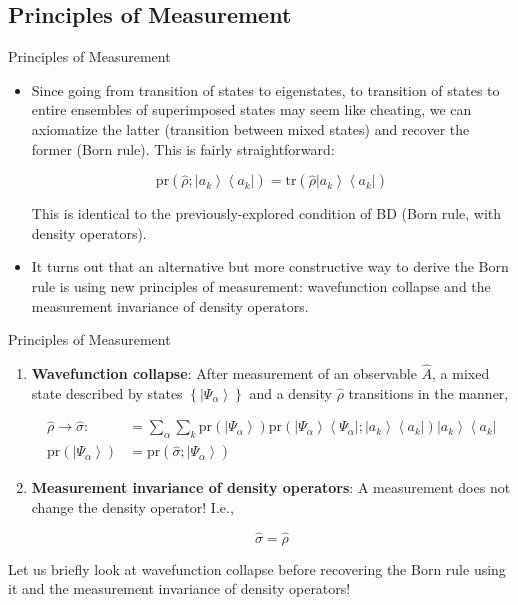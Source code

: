 \documentclass[9pt,handout]{beamer}
\newcommand{\pr}[0]{\text{pr}}
\newcommand{\tr}[0]{\text{tr}}
\begin{document}
\subsection{Principles of Measurement}
\begin{frame}{Principles of Measurement}
\begin{itemize}
\item Since going from transition of states to eigenstates, to transition of states to entire ensembles of superimposed states may seem like cheating, we can axiomatize the latter (transition between mixed states) and recover the former (Born rule). This is fairly straightforward:

$$\pr \left( \widehat{\rho}; \left\lvert a_k \right\rangle \left\langle a_k \right\rvert \right) = \tr \left( \widehat{\rho} \left\lvert a_k \right\rangle \left\langle a_k \right\rvert \right)$$

This is identical to the previously-explored condition of BD (Born rule, with density operators).

\item It turns out that an alternative but more constructive way to derive the Born rule is using new principles of measurement: wavefunction collapse and the measurement invariance of density operators.
\end{itemize}
\end{frame}

\begin{frame}{}
\begin{block}{Principles of Measurement}
\begin{enumerate}
\item \textbf{Wavefunction collapse}: After measurement of an observable $\widehat{A}$, a mixed state described by states $\left\{ \left\lvert \Psi_\alpha \right\rangle \right\}$ and a density $\widehat{\rho}$ transitions in the manner,

\begin{align*}
\widehat{\rho} \to \widehat{\sigma} : & = \sum_\alpha \sum_k \pr \left( \left\lvert \Psi_\alpha \right\rangle \right) \pr \left( \left\lvert \Psi_\alpha \right\rangle \left\langle \Psi_\alpha \right\rvert; \left\lvert a_k \right\rangle \left\langle a_k \right\rvert \right) \left\lvert a_k \right\rangle \left\langle a_k \right\rvert \\
\pr \left( \left\lvert \Psi_\alpha \right\rangle \right) & = \pr \left( \widehat{\sigma}; \left\lvert \Psi_\alpha \right\rangle \right)
\end{align*}

\item \textbf{Measurement invariance of density operators}: A measurement does not change the density operator! I.e.,

$$\widehat{\sigma} = \widehat{\rho}$$
\end{enumerate}
\end{block}

Let us briefly look at wavefunction collapse before recovering the Born rule using it and the measurement invariance of density operators!
\end{frame}
\end{document}
